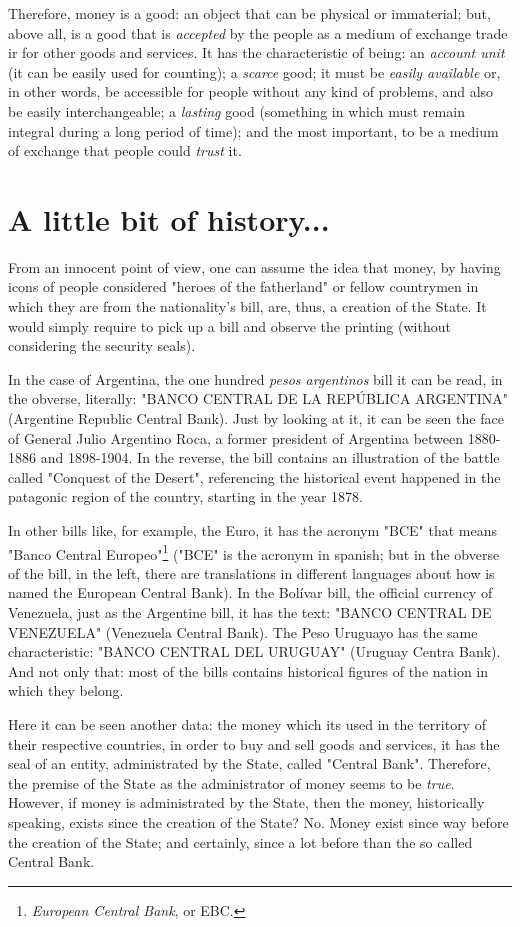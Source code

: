 \documentclass[12pt,a4paper,twoside]{book}
\begin{document}
Therefore, money is a good: an object that can be physical or immaterial; but, above all, is a good that is \textit{accepted} by the people as a medium of exchange trade ir for other goods and services. It has the characteristic of being: an \textit{account unit} (it can be easily used for counting); a \textit{scarce} good; it must be \textit{easily available} or, in other words, be accessible for people without any kind of problems, and also be easily interchangeable; a \textit{lasting} good (something in which must remain integral during a long period of time); and the most important, to be a medium of exchange that people could \textit{trust} it.

\section{A little bit of history...}
From an innocent point of view, one can assume the idea that money, by having icons of people considered "heroes of the fatherland" or fellow countrymen in which they are from the nationality's bill, are, thus, a creation of the State. It would simply require to pick up a bill and observe the printing (without considering the security seals).

In the case of Argentina, the one hundred \textit{pesos argentinos} bill it can be read, in the obverse, literally: "BANCO CENTRAL DE LA REPÚBLICA ARGENTINA" (Argentine Republic Central Bank). Just by looking at it, it can be seen the face of General Julio Argentino Roca, a former president of Argentina between 1880-1886 and 1898-1904. In the reverse, the bill contains an illustration of the battle called "Conquest of the Desert", referencing the historical event happened in the patagonic region of the country, starting in the year 1878.

In other bills like, for example, the Euro, it has the acronym "BCE" that means "Banco Central Europeo"\footnote{\textit{European Central Bank}, or EBC.} ("BCE" is the acronym in spanish; but in the obverse of the bill, in the left, there are translations in different languages about how is named the European Central Bank). In the Bolívar bill, the official currency of Venezuela, just as the Argentine bill, it has the text: "BANCO CENTRAL DE VENEZUELA" (Venezuela Central Bank). The Peso Uruguayo has the same characteristic: "BANCO CENTRAL DEL URUGUAY" (Uruguay Centra Bank). And not only that: most of the bills contains historical figures of the nation in which they belong.

Here it can be seen another data: the money which its used in the territory of their respective countries, in order to buy and sell goods and services, it has the seal of an entity, administrated by the State, called "Central Bank". Therefore, the premise of the State as the administrator of money seems to be \textit{true}. However, if money is administrated by the State, then the money, historically speaking, exists since the creation of the State? No. Money exist since way before the creation of the State; and certainly, since a lot before than the so called Central Bank.
\end{document}
